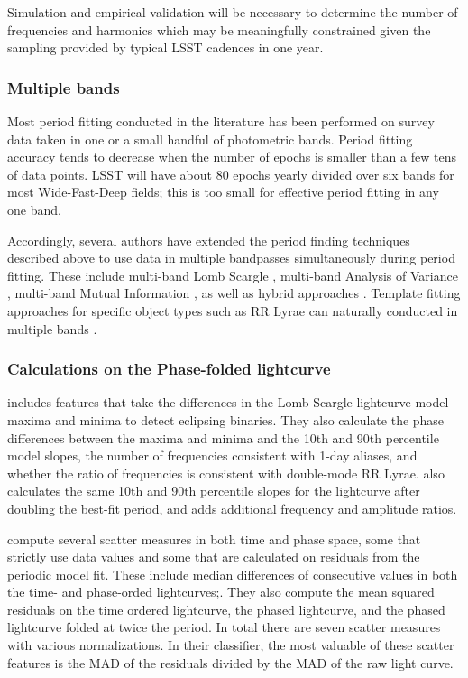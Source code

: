 \documentclass[DM,authoryear,toc]{lsstdoc}
\begin{document}
Simulation and empirical validation will be necessary to determine the number of frequencies and harmonics which may be meaningfully constrained given the sampling provided by typical LSST cadences in one year.


\subsubsection{Multiple bands}

Most period fitting conducted in the literature has been performed on survey data taken in one or a small handful of photometric bands.
Period fitting accuracy tends to decrease when the number of epochs is smaller than a few tens of data points.
LSST will have about 80 epochs yearly divided over six bands for most Wide-Fast-Deep fields; this is too small for effective period fitting in any one band.

Accordingly, several authors have extended the period finding techniques described above to use data in multiple bandpasses simultaneously during period fitting.
These include multi-band Lomb Scargle \citep{VanderPlas:15:MultibandLS}, multi-band Analysis of Variance \citep{Mondrik:15:MultibandAOV}, multi-band Mutual Information \citep{Huijse:18:MultibandMI}, as well as hybrid approaches \citep{Saha:17:A-Hybrid-Algori}.
Template fitting approaches for specific object types such as RR Lyrae can naturally conducted in multiple bands \citep[e.g.,][]{Stringer:19:DESRRLyr}.

\subsubsection{Calculations on the Phase-folded lightcurve}

\citet{Richards:12:ASASCatalog} includes features that take the differences in the Lomb-Scargle lightcurve model maxima and minima to detect eclipsing binaries.
They also calculate the phase differences between the maxima and minima and the 10th and 90th percentile model slopes, the number of frequencies consistent with 1-day aliases, and whether the ratio of frequencies is consistent with double-mode RR Lyrae.
\citet{Long:12:OptimizingVarClass} also calculates the same 10th and 90th percentile slopes for the lightcurve after doubling the best-fit period, and adds additional frequency and amplitude ratios.

\citet{Dubath:11:VariableClassification}  compute several scatter measures in both time and phase space, some that strictly use data values and some that are calculated on residuals from the periodic model fit.
These include median differences of consecutive values in both the time- and phase-orded lightcurves;.
They also compute the mean squared residuals on the time ordered lightcurve, the phased lightcurve, and the phased lightcurve folded at twice the period.
In total there are seven scatter measures with various normalizations.
In their classifier, the most valuable of these scatter features is the MAD of the residuals divided by the MAD of the raw light curve.
\end{document}
